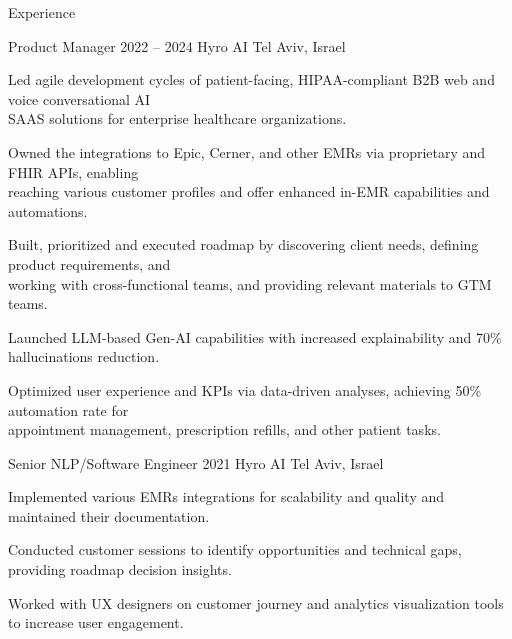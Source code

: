 \documentclass{resume} %
\begin{document}
\begin{rSection}{Experience}

\begin{rSubsection}
	{Product Manager}
	{2022 -- 2024}
	{Hyro AI}
	{Tel Aviv, Israel}

	\setlength{\itemindent}{.5cm}
	
	
	
	\item Led agile development cycles of patient-facing, HIPAA-compliant B2B web and voice conversational AI\\\hspace*{.5cm}SAAS solutions for enterprise healthcare organizations.
	\item Owned the integrations to Epic, Cerner, and other EMRs via proprietary and FHIR APIs, enabling \\\hspace*{.5cm}reaching various customer profiles and offer enhanced in-EMR capabilities and automations.
	\item Built, prioritized and executed roadmap by discovering client needs, defining product requirements, and \\\hspace*{.5cm}working with cross-functional teams, and providing relevant materials to GTM teams.
	\item Launched LLM-based Gen-AI capabilities with increased explainability and 70\% hallucinations reduction.
	\item Optimized user experience and KPIs via data-driven analyses, achieving 50\% automation rate for \\\hspace*{.5cm}appointment management, prescription refills, and other patient tasks.
\end{rSubsection}

\begin{rSubsection}
	{Senior NLP/Software Engineer}
	{2021}
	{Hyro AI}
	{Tel Aviv, Israel}
	
	\setlength{\itemindent}{.5cm}
	
	\item Implemented various EMRs integrations for scalability and quality and maintained their documentation.
	\item Conducted customer sessions to identify opportunities and technical gaps, providing roadmap decision insights.
	\item Worked with UX designers on customer journey and analytics visualization tools to increase user engagement.


\end{rSubsection}
\end{rSection}
\end{document}
